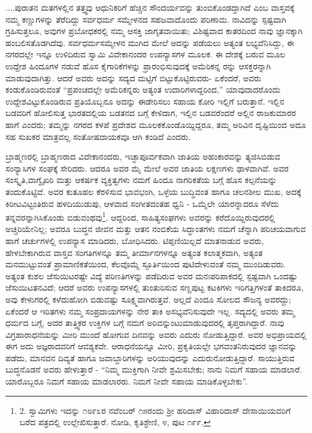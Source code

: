 ....ಪುರಾತನ ಮತಗಳಲ್ಲಿನ ತತ್ತ್ವವು ಆಧುನಿಕರಿಗೆ ಹೆಚ್ಚಿನ ಸೌಂದರ್ಯವನ್ನು ತುಂಬಿಕೊಂಡದ್ದಾಗಿದೆ ಎಂಬ ವಾಸ್ತವಕ್ಕೆ ನಮ್ಮ ಕಣ್ಣುಗಳನ್ನು ತೆರೆದಿದ್ದು ಸರ್ವಧರ್ಮ ಸಮ್ಮೇಳನದ ಸಹಜವಾದೊಂದು ಪರಿಣಾಮ. ನಾವಿದನ್ನು ಸ್ಪಷ್ಟವಾಗಿ ಗ್ರಹಿಸುತ್ತಲೂ, ಅವುಗಳ ಪ್ರಬೋಧಕರಲ್ಲಿ ನಮ್ಮ ಆಸಕ್ತಿ ಜಾಗೃತವಾಯಿತು; ವಿಶಿಷ್ಟವಾದ ಕಾತರದಿಂದ ನಾವು ಜ್ಞಾನಕ್ಕಾಗಿ ಹಂಬಲಿಸತೊಡಗಿದೆವು. ಸರ್ವಧರ್ಮಸಮ್ಮೇಳನ ಮುಗಿದ ಮೇಲೆ ಅದನ್ನು ಪಡೆಯಲು ಅತ್ಯಂತ ಲಭ್ಯವೆನಿಸಿದ್ದು, ಈ ನಗರದಲ್ಲೇ ಇನ್ನೂ ಉಳಿದಿರುವ ಸ್ವಾಮಿ  ವಿವೇಕಾನಂದರ ಉಪನ್ಯಾಸಗಳ ಮೂಲಕ. ಈ ದೇಶಕ್ಕೆ ಬರುವ ಮೂಲ ಉದ್ದೇಶ ಹಿಂದೂಗಳ ನಡುವೆ ಹೊಸ ಕೈಗಾರಿಕೆಗಳನ್ನು ಪ್ರಾರಂಭಿಸುವುದಕ್ಕೆ ಅಮೆರಿಕನ್ನ ರನ್ನು ಆಸಕ್ತರನ್ನಾಗಿ ಮಾಡುವುದಾಗಿತ್ತು. ಆದರೆ ಅವರು ಅದನ್ನು ಸದ್ಯದ ಮಟ್ಟಿಗೆ ಬಿಟ್ಟುಕೊಟ್ಟಿರುವರು- ಏಕೆಂದರೆ, ಅವರು ಕಂಡುಕೊಂಡಿರುವಂತೆ “ಪ್ರಪಂಚದಲ್ಲೇ ಅಮೆರಿಕನ್ನರು ಅತ್ಯಂತ ಉದಾರಿಗಳಾದ್ದರಿಂದ,” ಯಾವುದಾದರೊಂದು ಉದ್ದೇಶವಿಟ್ಟುಕೊಂಡಿರುವ ಪ್ರತಿಯೊಬ್ಬನೂ ಅದನ್ನು ಈಡೇರಿಸಲು ಸಹಾಯ ಕೋರಿ ಇಲ್ಲಿಗೆ ಬರುತ್ತಾನೆ. ಇಲ್ಲಿನ ಬಡವರಿಗೆ ಹೋಲಿಸುತ್ತ ಭಾರತದಲ್ಲಿಯ ಬಡತನದ ಬಗ್ಗೆ ಕೇಳಿದಾಗ, ಇಲ್ಲಿನ ಬಡವರೆಂದರೆ ಅಲ್ಲಿನ ರಾಜಕುಮಾರರ ಹಾಗೆ ಎಂದರು; ತಮ್ಮನ್ನು ನಗರದ ಕಳಪೆ ಪ್ರದೇಶದ ಮೂಲಕಕೊಂಡೊಯ್ದಿದ್ದರೂ, ತಮ್ಮ ಅರಿವಿನ ದೃಷ್ಟಿಯಿಂದ ಅದೂ ಸಹ ಸುಖಕರ ಮಾತ್ರವಲ್ಲ ಸಂತೋಷದಾಯಕವೂ ಆಗಿ ಕಂಡಿದೆ ಎಂದರು.

ಬ್ರಾಹ್ಮಣರಲ್ಲಿ ಬ್ರಾಹ್ಮಣರಾದ ವಿವೇಕಾನಂದರು, ಇಚ್ಛಾಪೂರ್ವಕವಾಗಿ ಜಾತಿಯ ಅಹಂಕಾರವನ್ನು ತ್ಯಜಿಸಿಬಿಡುವ ಸಂನ್ಯಾಸಿಗಳ ಸಂಘಕ್ಕೆ ಸೇರಿದರು. ಆದರೂ ಅವರ ಮೈ ಮೇಲೆ ಅವರ ಜಾತಿಯ ಲಕ್ಷಣಗಳು ಢಾಳವಾಗಿವೆ. ಅವರ ಸಂಸ್ಕೃತಿ,ವಾಗ್ವೈಖರಿ ಮತ್ತು ಆಕರ್ಷಕ ವ್ಯಕ್ತಿತ್ವಗಳು ನಮಗೆ ಹಿಂದೂ ನಾಗರಿಕತೆಯ ಬಗ್ಗೆ ಹೊಸ ಕಲ್ಪನೆಯನ್ನು ತಂದುಕೊಟ್ಟಿವೆ. ಅವರ ಕುತೂಹಲ ಕೆರಳಿಸುವ ಭಾವಭಂಗಿ, ಒಳ್ಳೆಯ ಬುದ್ಧಿವಂತ ಹಾಗೂ ಚಲನಶೀಲ ಮುಖ, ಅದಕ್ಕೆ ಕಿರೀಟವಿಟ್ಟಂತಿರುವ ಹಳದಿಯುಡುಪು, ಆಳವಾದ ಸಂಗೀತದಂತಹ ಧ್ವನಿ - ಒಮ್ಮೆಲೇ ಯಾರನ್ನಾದರೂ ಸೆಳೆದು ತನ್ನವರನ್ನಾಗಿಸಿಕೊಂಡು ಬಿಡುವಂಥವು\footnote{2. ಸ್ವಾಮಿಗಳು ಇದನ್ನು ೧೮೯೩ರ ನವೆಂಬರ್ ೧೫ರಂದು ಶ‍್ರೀ ಹರಿದಾಸ್ ವಿಹಾರಿದಾಸ್ ದೇಸಾಯಿಯವರಿಗೆ ಬರೆದ ಪತ್ರದಲ್ಲಿ ಉಲ್ಲೇಖಿಸುತ್ತಾರೆ. ನೋಡಿ, ಕೃತಿಶ್ರೇಣಿ, ೪, ಪುಟ ೧೯೯.}. ಆದ್ದರಿಂದ, ಸಾಹಿತ್ಯಸಂಘಗಳು ಅವರನ್ನು ಕರೆದೊಯ್ದಿರುವುದರಲ್ಲಿ ಅಚ್ಚರಿಯೇನಿಲ್ಲ; ಅವರೂ ಬುದ್ಧನ ಜೀವನ ಮತ್ತು ಆತನ ನಂಬಿಕೆಯ ಸಿದ್ಧಾಂತಗಳು ನಮಗೆ ಚೆನ್ನಾಗಿ ಪರಿಚಯವಾಗುವ ಹಾಗೆ ಚರ್ಚುಗಳಲ್ಲಿ ಉಪನ್ಯಾಸ ಮಾಡಿದರು, ಬೋಧಿಸಿದರು. ಟಿಪ್ಪಣಿಯಿಲ್ಲದೆ ಮಾತನಾಡುವ ಅವರು, ಹೇಳಬೇಕಾಗಿರುವ ವಾಸ್ತವ ಸಂಗತಿಗಳನ್ನೂ ತಮ್ಮ ತೀರ್ಮಾನಗಳನ್ನೂ ಅತ್ಯಂತ ಕಲಾತ್ಮಕವಾಗಿ, ಅತ್ಯಂತ ಮನಮುಟ್ಟುವಂತೆ ಪ್ರಾಮಾಣಿಕತೆಯಿಂದ, ಕೆಲವೊಮ್ಮೆ ಸ್ಫೂರ್ತಿಯಿಂದ ಪುಟಿದೇಳುವಂತೆ ನಮ್ಮ ಮುಂದಿಡುವರು. ಅತ್ಯಂತ ಕುಶಲ ಜೆಸುಯಿಟರಷ್ಟೇ ವಿದ್ಯೆ ಪರಿಣತಿಗಳನ್ನು ಪಡೆದಿರುವ ಅವರ ಮನಃಪರಿಪಾಕದಲ್ಲಿ ಸ್ಪಷ್ಟವಾಗಿ ಒಂದಷ್ಟು ಜೆಸುಯಿಟತನವಿದೆ; ಆದರೆ ಅವರು ಉಪನ್ಯಾಸಗಳಲ್ಲಿ ತುಂತುರಿಸುವ ಸಣ್ಣಪುಟ್ಟ ಕಟಕಿಗಳು ಇರಿಗತ್ತಿಗಳಂತೆ ತಾಕಿದರೂ, ಅವು ಕೇಳುಗರಲ್ಲಿ ಕಳೆದುಹೋಗಿ ಬಿಡುವಷ್ಟು ಸೂಕ್ಷ್ಮವಾಗಿರುತ್ತವೆ. ಅಲ್ಲದೆ ಎಂದೂ ಸೋಲದ ಸೌಜನ್ಯ ಅವರದ್ದು; ಏಕೆಂದರೆ ಆ ಇರಿತಗಳು ನಮ್ಮ ಸಂಪ್ರದಾಯಗಳನ್ನು ನೇರ ತಾಕಿ ಅಸಭ್ಯವೆನಿಸುವುದೇ ಇಲ್ಲ. ಸದ್ಯದಲ್ಲಿ ಅವರು ತಮ್ಮ ಧರ್ಮದ ಬಗ್ಗೆ, ಅದರ ತಾತ್ತ್ವಿಕರ ಉಕ್ತಿಗಳ ಬಗ್ಗೆ ನಮಗೆ ಅರಿವನ್ನುಂಟುಮಾಡುವುದರಲ್ಲಿ ತೃಪ್ತರಾಗಿದ್ದಾರೆ. ನಾವು ವಿಗ್ರಹಾರಾಧನೆಯನ್ನು ಮೀರಿ ಮುಂದೆ ಹೋಗುವ ದಿನವನ್ನು ಅವರು ಎದುರು ನೋಡುತ್ತಿದ್ದಾರೆ. ಅವರ ಅಭಿಪ್ರಾಯದಲ್ಲಿ ಈಗ ಅದು ಅಜ್ಞರಾದವರಿಗೆ ಆವಶ್ಯಕವೇ. ಆರಾಧನೆಯನ್ನೂ ಮೀರಿ, ಪ್ರಕೃತಿಯಲ್ಲೇ ಭಗವಂತನಿರುವುದರ ಜ್ಞಾನವನ್ನು ಪಡೆದು, ಮಾನವನ ದಿವ್ಯತೆ ಹಾಗೂ ಜವಾಬ್ದಾರಿಗಳನ್ನು ಅರಿಯುವುದನ್ನು ಎದುರುನೋಡುತ್ತಿದ್ದಾರೆ. ಸಾಯುತ್ತಿರುವ ಬುದ್ಧನೊಡನೆ ಅವರು ಹೇಳುತ್ತಾರೆ - “ನಿಮ್ಮ ಮುಕ್ತಿಗಾಗಿ ನೀವೇ ಶ್ರಮಿಸಬೇಕು; ನಾನು ನಿಮಗೆ ಸಹಾಯ ಮಾಡಲಾರೆ. ಯಾರೊಬ್ಬರೂ ನಿಮಗೆ ಸಹಾಯ ಮಾಡಲಾರರು. ನಿಮಗೆ ನೀವೇ ಸಹಾಯ ಮಾಡಿಕೊಳ್ಳಬೇಕು”.

